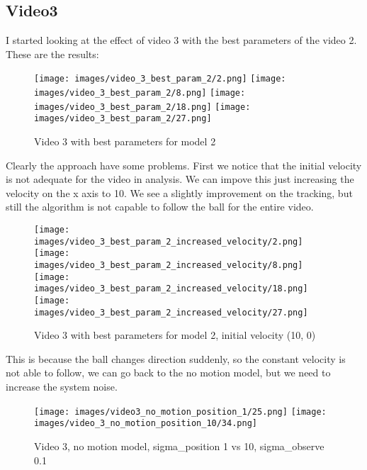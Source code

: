 \documentclass{ETHExercise}
\begin{document}
\newpage

\subsection{Video3}

I started looking at the effect of video 3 with the best parameters of the video 2.
These are the results:
\begin{figure}[!h]
    \texttt{[image: images/video\_3\_best\_param\_2/2.png]}
  \endminipage
    \texttt{[image: images/video\_3\_best\_param\_2/8.png]}
  \endminipage
    \texttt{[image: images/video\_3\_best\_param\_2/18.png]}
  \endminipage\space
    \texttt{[image: images/video\_3\_best\_param\_2/27.png]}
  \endminipage
  \caption{Video 3 with best parameters for model 2}
\end{figure}
 Clearly the approach have some problems. First we notice that the initial velocity is not adequate for the 
 video in analysis. We can impove this just increasing the velocity on the x axis to 10.
 We see a slightly improvement on the tracking, but still the algorithm is not capable to follow the ball for the entire video.

\begin{figure}[!h]
    \texttt{[image: images/video\_3\_best\_param\_2\_increased\_velocity/2.png]}
  \endminipage
    \texttt{[image: images/video\_3\_best\_param\_2\_increased\_velocity/8.png]}
  \endminipage
    \texttt{[image: images/video\_3\_best\_param\_2\_increased\_velocity/18.png]}
  \endminipage\space
    \texttt{[image: images/video\_3\_best\_param\_2\_increased\_velocity/27.png]}
  \endminipage
  \caption{Video 3 with best parameters for model 2, initial velocity (10, 0)}
\end{figure}

This is because the ball changes direction suddenly, so the constant velocity is not able to follow, we can go back to the no motion model,
but we need to increase the system noise.

\begin{figure}[!h]
    \texttt{[image: images/video3\_no\_motion\_position\_1/25.png]}
  \endminipage
    \texttt{[image: images/video\_3\_no\_motion\_position\_10/34.png]}
  \endminipage
  \caption{Video 3, no motion model, sigma\_position 1 vs 10, sigma\_observe 0.1}
\end{figure}
\end{document}
